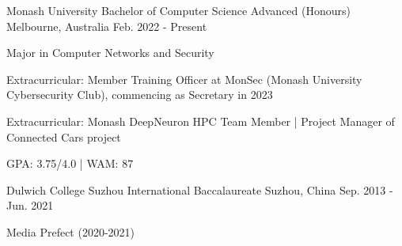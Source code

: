 

\begin{cventries}


    \cventry
    {Monash University}
    {Bachelor of Computer Science Advanced (Honours)}
    {Melbourne, Australia}
    {Feb. 2022 - Present}
    {
        \begin{cvitems}
            \item {Major in Computer Networks and Security}
            \item {Extracurricular: Member Training Officer at MonSec (Monash University Cybersecurity Club), commencing as Secretary in 2023}
            \item {Extracurricular: Monash DeepNeuron HPC Team Member | Project Manager of Connected Cars project}
            \item {GPA: 3.75/4.0 | WAM: 87}
        \end{cvitems}
    }


  \cventry
    {Dulwich College Suzhou} %
    {International Baccalaureate} %
    {Suzhou, China} %
    {Sep. 2013 - Jun. 2021} %
    {
      \begin{cvitems} %
        \item {Media Prefect (2020-2021)}
      \end{cvitems}
    }

\end{cventries}
\vspace{-3.0mm}